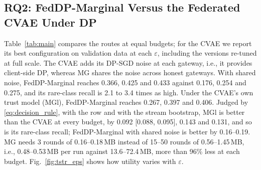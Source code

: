 \documentclass[conference]{IEEEtran}
\begin{document}
\subsection{RQ2: FedDP-Marginal Versus the Federated CVAE Under DP}\label{subsec:rq2}
Table~\ref{tab:main} compares the routes at equal budgets; for the CVAE we report its best configuration on validation data at each $\varepsilon$, including the versions re-tuned at full scale. The CVAE adds its DP-SGD noise at each gateway, i.e., it provides client-side DP, whereas MG shares the noise across honest gateways. With shared noise, FedDP-Marginal reaches 0.366, 0.425 and 0.433 against 0.176, 0.254 and 0.275, and its rare-class recall is 2.1 to 3.4 times as high. Under the CVAE's own trust model (MGl), FedDP-Marginal reaches 0.267, 0.397 and 0.406. Judged by \eqref{eq:decision_rule}, with the row and with the stream bootstrap, MGl is better than the CVAE at every budget, by 0.092 [0.088, 0.095], 0.143 and 0.131, and so is its rare-class recall; FedDP-Marginal with shared noise is better by 0.16--0.19. MG needs 3 rounds of 0.16--0.18\,MB instead of 15--50 rounds of 0.56--1.45\,MB, i.e., 0.48--0.53\,MB per run against 13.6--72.4\,MB, more than 96\% less at each budget. Fig.~\ref{fig:tstr_eps} shows how utility varies with $\varepsilon$.
\end{document}

